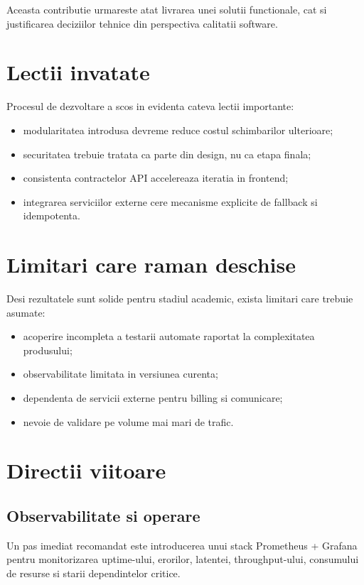 Aceasta contributie urmareste atat livrarea unei solutii functionale, cat si justificarea deciziilor tehnice din perspectiva calitatii software.

\section{Lectii invatate}

Procesul de dezvoltare a scos in evidenta cateva lectii importante:
\begin{itemize}[leftmargin=1.2cm]
    \item modularitatea introdusa devreme reduce costul schimbarilor ulterioare;
    \item securitatea trebuie tratata ca parte din design, nu ca etapa finala;
    \item consistenta contractelor API accelereaza iteratia in frontend;
    \item integrarea serviciilor externe cere mecanisme explicite de fallback si idempotenta.
\end{itemize}

\section{Limitari care raman deschise}

Desi rezultatele sunt solide pentru stadiul academic, exista limitari care trebuie asumate:
\begin{itemize}[leftmargin=1.2cm]
    \item acoperire incompleta a testarii automate raportat la complexitatea produsului;
    \item observabilitate limitata in versiunea curenta;
    \item dependenta de servicii externe pentru billing si comunicare;
    \item nevoie de validare pe volume mai mari de trafic.
\end{itemize}

\section{Directii viitoare}

\subsection{Observabilitate si operare}

Un pas imediat recomandat este introducerea unui stack Prometheus + Grafana pentru monitorizarea uptime-ului, erorilor, latentei, throughput-ului, consumului de resurse si starii dependintelor critice.

